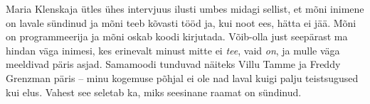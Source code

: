 Maria Klenskaja ütles ühes intervjuus ilusti umbes midagi sellist, et mõni inimene on lavale sündinud
ja mõni teeb kõvasti tööd ja, kui noot ees, hätta ei jää. Mõni on programmeerija ja 
mõni oskab koodi kirjutada. Võib-olla just 
seepärast ma hindan väga inimesi, kes erinevalt minust mitte ei \emph{tee}, vaid \emph{on}, ja mulle väga meeldivad päris asjad.
Samamoodi tunduvad näiteks Villu Tamme ja Freddy Grenzman päris -- minu kogemuse põhjal ei ole nad laval 
kuigi palju teistsugused kui elus. Vahest see seletab ka, miks 
seesinane raamat on sündinud.
